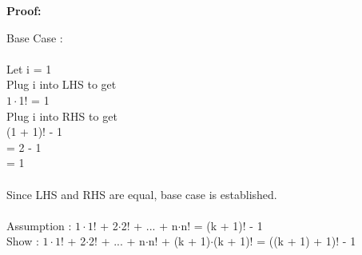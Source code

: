 \documentclass[12pt]{article}
\begin{document}
\par
\bigskip
{\bf Proof:}
\par


Base Case : \\
\\
	Let i = 1 \\
	Plug i into LHS to get \\
	$1\cdot$1! = 1 \\
	Plug i into RHS to get \\
	(1 + 1)! - 1 \\
	= 2 - 1\\
	= 1 \\
	\\
Since LHS and RHS are equal, base case is established. \\
\\

Assumption : $1\cdot1$! + 2$\cdot$2! + ... + n$\cdot$n! = (k + 1)! - 1 \\
Show : $1\cdot1$! + 2$\cdot$2! + ... + n$\cdot$n! + (k + 1)$\cdot$(k + 1)!  = ((k + 1) + 1)! - 1 \\
\end{document}
